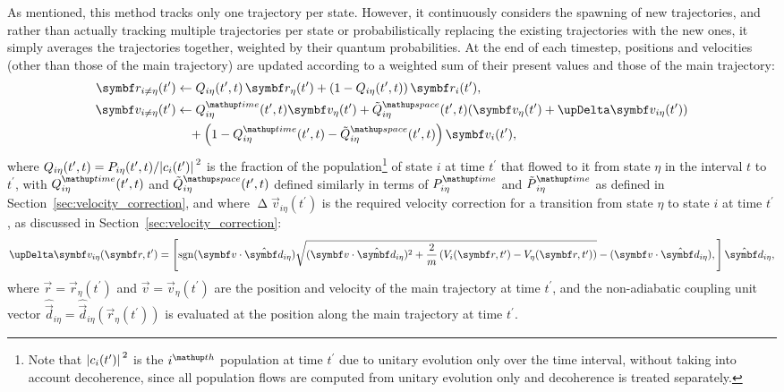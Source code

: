 As mentioned, this method tracks only one trajectory per state. However, it continuously considers the spawning of new trajectories, and rather than actually tracking multiple trajectories per state or probabilistically replacing the existing trajectories with the new ones, it simply averages the trajectories together, weighted by their quantum probabilities. At the end of each timestep, positions and velocities (other than those of the main trajectory) are updated according to a weighted sum of their present values and those of the main trajectory:
\begin{align}\label{eq:position_averaging}
\vec r_{i\neq\eta}(t^\prime) &\leftarrow 
  Q_{i\eta}(t^\prime, t)\,\vec r_\eta(t^\prime)
  + \left(1 - Q_{i\eta}(t^\prime, t)\right)\vec r_i(t^\prime),\\
\vec v_{i\neq\eta}(t^\prime) &\leftarrow
  Q^\up{time}_{i\eta}(t^\prime, t)\vec v_\eta(t^\prime)
  + \tilde Q^\up{space}_{i\eta}(t^\prime, t)(\vec v_\eta(t^\prime) + \upDelta \vec v_{i\eta}(t^\prime))\nonumber\\
  &\phantom{\rightarrow} + \left(1 - Q^\up{time}_{i\eta}(t^\prime, t) - \tilde Q^\up{space}_{i\eta}(t^\prime, t)\right)\vec v_i(t^\prime),
  \label{eq:velocity_averaging}
\end{align}
where $Q_{i\eta}(t^\prime, t) = P_{i\eta}(t^\prime, t)/\abs{c_i(t^\prime)}^2$ is the fraction of the population\footnote{Note that $\abs{c_i(t^\prime)}^2$ is the $i^\up{th}$ population at time $t^\prime$ due to unitary evolution only over the time interval, without taking into account decoherence, since all population flows are computed from unitary evolution only and decoherence is treated separately.} of state $i$ at time $t^\prime$ that flowed to it from state $\eta$ in the interval $t$ to $t^\prime$, with $Q_{i\eta}^\up{time}(t^\prime, t)$ and $\tilde Q_{i\eta}^\up{space}(t^\prime, t)$ defined similarly in terms of $P_{i\eta}^\up{time}$ and $\tilde P_{i\eta}^\up{time}$ as defined in Section~\ref{sec:velocity_correction}, and where $\upDelta \vec v_{i\eta}(t^\prime)$ is the required velocity correction for a transition from state $\eta$ to state $i$ at time $t^\prime$, as discussed in Section~\ref{sec:velocity_correction}:
\begin{align}\label{eq:non_markovian_velocity_jump}
\upDelta \vec v_{i\eta}(\vec r, t^\prime) = \left[\sgn(\vec v\cdot \hat{\vec d}_{i\eta})
\sqrt{(\vec v\cdot \hat{\vec d}_{i\eta})^2 + \frac2m\left(V_i(\vec r, t^\prime) - V_\eta(\vec r, t^\prime)\right)} - (\vec v\cdot \hat{\vec d}_{i\eta}),
\right]\hat{\vec d}_{i\eta},
\end{align}
where $\vec r = \vec r_\eta(t^\prime)$ and $\vec v = \vec v_\eta(t^\prime)$ are the position and velocity of the main trajectory at time $t^\prime$, and the non-adiabatic coupling unit vector $\hat{\vec d}_{i\eta} = \hat{\vec d}_{i\eta}(\vec r_\eta(t^\prime))$ is evaluated at the position along the main trajectory at time $t^\prime$.

